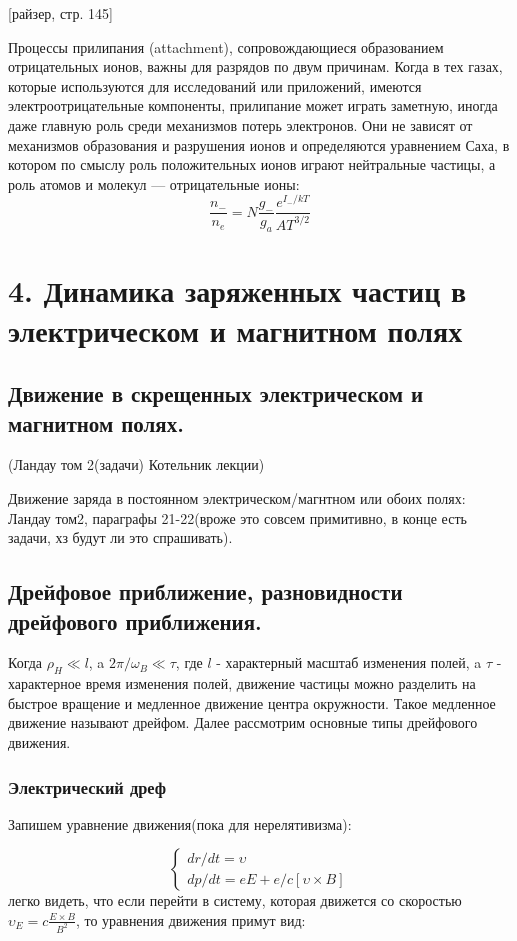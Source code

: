 \documentclass[10pt, a4paper]{article}
\begin{document}
 [райзер, стр. 145]
 
 
Процессы прилипания (attachment), сопровождающиеся образованием отрицательных ионов, важны для разрядов по двум причинам. Когда в тех газах, которые используются для исследований или приложений, имеются электроотрицательные компоненты, прилипание может играть заметную, иногда даже главную роль среди механизмов потерь электронов.
Они не зависят от механизмов образования и разрушения ионов и определяются уравнением Саха, в котором по смыслу роль положительных ионов играют нейтральные частицы, а роль атомов и молекул — отрицательные ионы:
\begin{equation}
	\frac{n_{-}}{n_e}=N\frac{g_{-}}{g_{a}}\frac{e^{I_{-}/kT}}{AT^{3/2}}
\end{equation}

\section{4. Динамика заряженных частиц в электрическом и магнитном полях}
\label{sec.4}

\subsection{Движение в скрещенных электрическом и магнитном полях.}
\label{sec.4.1}
(Ландау том 2(задачи) Котельник лекции)

Движение заряда в постоянном электрическом/магнтном или обоих полях: Ландау том2, параграфы 21-22(вроже это совсем 
примитивно, в конце есть задачи, хз будут ли это спрашивать).

\subsection{Дрейфовое приближение, разновидности дрейфового приближения.}
\label{sec.4.2}
Когда $\rho_H\ll l$, a $2\pi/\omega_B \ll \tau$, где $l$ - характерный масштаб изменения полей, a $\tau$ - характерное
время изменения полей, движение частицы можно разделить на быстрое вращение и медленное движение центра окружности.
Такое медленное движение называют дрейфом. Далее рассмотрим основные типы дрейфового движения.

\subsubsection{Электрический дреф}
\label{sec.4.2.1}
Запишем уравнение движения(пока для нерелятивизма):

\begin{equation}
    \begin{cases}
    \label{eq.4.2.1-motion}
        dr/dt = \upsilon \\
        dp/dt = e E + e/c [\upsilon \times B]
    \end{cases}
\end{equation}
легко видеть, что если перейти в систему, которая движется со скоростью $\upsilon_E = c\frac{E\times B}{B^2}$, то
уравнения движения примут вид:
\end{document}
